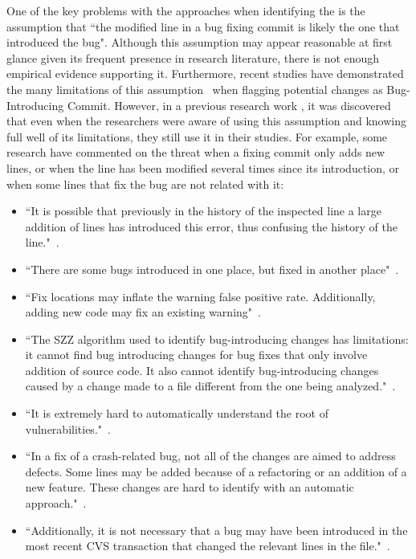 \documentclass[a4paper, 12pt]{book}
\begin{document}
One of the key problems with the approaches when identifying the \BIC is the assumption that ``the modified line in a bug fixing commit is likely the one that introduced the bug". Although this assumption may appear reasonable at first glance given its frequent presence in research literature, there is not enough empirical evidence supporting it. Furthermore, recent studies have demonstrated the many limitations of this assumption~\cite{da2016framework, rodriguez2018reproducibility} when flagging potential changes as Bug-Introducing Commit. However, in a previous research work \cite{rodriguez2018reproducibility}, it was discovered that even when the researchers were aware of using this assumption and knowing full well of its limitations, they still use it in their studies. For example, some research have commented on the threat when a fixing commit only adds new lines, or when the line has been modified several times since its introduction, or when some lines that fix the bug are not related with it:

\begin{itemize}
  \item ``It is possible that previously in the history of the inspected line a large addition of lines has introduced this error, thus confusing the history of the line."~\cite{williams2008szz}.
  \item ``There are some bugs introduced in one place, but fixed in another place"~\cite{yuan2013predicting}.
  \item ``Fix locations may inflate the warning false positive rate. Additionally, adding new code may fix an existing warning"~\cite{kim2007warnings}.
  \item ``The SZZ algorithm used to identify bug-introducing changes has limitations: it cannot find bug introducing changes for bug fixes that only involve addition of source code. It also cannot identify bug-introducing changes caused by a change made to a file different from the one being analyzed."~\cite{shivaji2013reducing}.
  \item ``It is extremely hard to automatically understand the root of vulnerabilities."~\cite{nguyen2013reliability}.
  \item ``In a fix of a crash-related bug, not all of the changes are aimed to address defects. Some lines may be added because of a refactoring or an addition of a new feature. These changes are hard to identify with an automatic approach."~\cite{jongyindee2011good}.
  \item ``Additionally, it is not necessary that a bug may have been introduced in the most recent CVS transaction that changed the relevant lines in the file."~\cite{abreu2009developer}.
\end{itemize}
\end{document}
